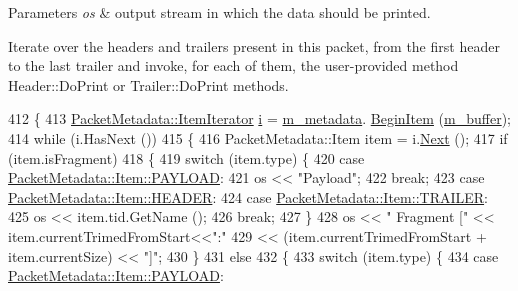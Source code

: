 \begin{DoxyParams}{Parameters}
{\em os} & output stream in which the data should be printed.\\
\hline
\end{DoxyParams}
Iterate over the headers and trailers present in this packet, from the first header to the last trailer and invoke, for each of them, the user-\/provided method Header\+::\+Do\+Print or Trailer\+::\+Do\+Print methods. 
\begin{DoxyCode}
412 \{
413   \hyperlink{classns3_1_1PacketMetadata_a32606143b9dd3fe0db01264200e27783}{PacketMetadata::ItemIterator} \hyperlink{bernuolliDistribution_8m_a6f6ccfcf58b31cb6412107d9d5281426}{i} = \hyperlink{classns3_1_1Packet_af3f95fba7966191bd152bcedd5fbcd6b}{m\_metadata}.
      \hyperlink{classns3_1_1PacketMetadata_aa574c0500da92d42d3cb53ae8a9fd0ad}{BeginItem} (\hyperlink{classns3_1_1Packet_a0f17bc9b4177865c9fe48fc927d57996}{m\_buffer});
414   \textcolor{keywordflow}{while} (i.HasNext ())
415     \{
416       PacketMetadata::Item item = i.\hyperlink{classns3_1_1PacketMetadata_1_1ItemIterator_a3d59a1673dca4338f41d3c788ccd3e10}{Next} ();
417       \textcolor{keywordflow}{if} (item.isFragment)
418         \{
419           \textcolor{keywordflow}{switch} (item.type) \{
420             \textcolor{keywordflow}{case} \hyperlink{structns3_1_1PacketMetadata_1_1Item_ab0a06781a8793079afeab58a9a9b3174ac2bc28ee0adb79d428d3f5a11be52f80}{PacketMetadata::Item::PAYLOAD}:
421               os << \textcolor{stringliteral}{"Payload"};
422               \textcolor{keywordflow}{break};
423             \textcolor{keywordflow}{case} \hyperlink{structns3_1_1PacketMetadata_1_1Item_ab0a06781a8793079afeab58a9a9b3174a35a76b7dc57ca42587ecfb5f81f1bcb2}{PacketMetadata::Item::HEADER}:
424             \textcolor{keywordflow}{case} \hyperlink{structns3_1_1PacketMetadata_1_1Item_ab0a06781a8793079afeab58a9a9b3174ab32282a2f84adad5e57549c03179ff45}{PacketMetadata::Item::TRAILER}:
425               os << item.tid.GetName ();
426               \textcolor{keywordflow}{break};
427             \}
428           os << \textcolor{stringliteral}{" Fragment ["} << item.currentTrimedFromStart<<\textcolor{stringliteral}{":"}
429              << (item.currentTrimedFromStart + item.currentSize) << \textcolor{stringliteral}{"]"};
430         \}
431       \textcolor{keywordflow}{else}
432         \{
433           \textcolor{keywordflow}{switch} (item.type) \{
434             \textcolor{keywordflow}{case} \hyperlink{structns3_1_1PacketMetadata_1_1Item_ab0a06781a8793079afeab58a9a9b3174ac2bc28ee0adb79d428d3f5a11be52f80}{PacketMetadata::Item::PAYLOAD}:

\end{DoxyCode}
